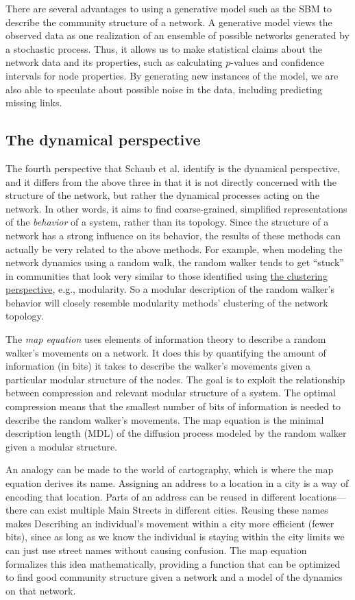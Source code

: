 There are several advantages to using a generative model such as the SBM
to describe the community structure of a network. A generative model
views the observed data as one realization of an ensemble of possible
networks generated by a stochastic process. Thus, it allows us to make
statistical claims about the network data and its properties, such as
calculating \(p\)-values and confidence intervals for node properties.
By generating new instances of the model, we are also able to speculate
about possible noise in the data, including predicting missing links.

\hypertarget{the-dynamical-perspective}{\subsection{The dynamical
perspective}\label{the-dynamical-perspective}}

The fourth perspective that Schaub et al. identify is the dynamical
perspective, and it differs from the above three in that it is not
directly concerned with the structure of the network, but rather the
dynamical processes acting on the network. In other words, it aims to
find coarse-grained, simplified representations of the \emph{behavior}
of a system, rather than its topology. Since the structure of a network
has a strong influence on its behavior, the results of these methods can
actually be very related to the above methods. For example, when
modeling the network dynamics using a random walk, the random walker
tends to get ``stuck'' in communities that look very similar to those
identified using \protect\hyperlink{the-clustering-perspective}{the
clustering perspective}, e.g., modularity. So a modular description of
the random walker's behavior will closely resemble modularity methods'
clustering of the network topology.

The \emph{map equation} uses elements of information theory to describe
a random walker's movements on a network. It does this by quantifying
the amount of information (in bits) it takes to describe the walker's
movements given a particular modular structure of the nodes. The goal is
to exploit the relationship between compression and relevant modular
structure of a system. The optimal compression means that the smallest
number of bits of information is needed to describe the random walker's
movements. The map equation is the minimal description length (MDL) of
the diffusion process modeled by the random walker given a modular
structure.

An analogy can be made to the world of cartography, which is where the
map equation derives its name. Assigning an address to a location in a
city is a way of encoding that location. Parts of an address can be
reused in different locations---there can exist multiple Main Streets in
different cities. Reusing these names makes Describing an individual's
movement within a city more efficient (fewer bits), since as long as we
know the individual is staying within the city limits we can just use
street names without causing confusion. The map equation formalizes this
idea mathematically, providing a function that can be optimized to find
good community structure given a network and a model of the dynamics on
that network.

